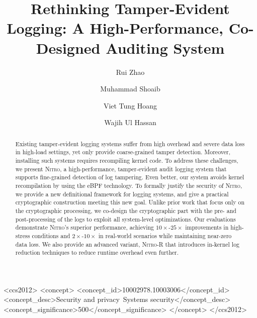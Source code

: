 \documentclass[sigconf]{sty/acmart}
\newcommand{\Sys}{\mbox{\textsc{Nitro}}\xspace}
\newcommand{\SysR}{\mbox{\textsc{Nitro-R}}\xspace}
\newcommand{\Syss}{{\textsc{Nitro}}'s }
\begin{document}
\title{Rethinking Tamper-Evident Logging: A High-Performance, Co-Designed Auditing System}

\author{Rui Zhao}

\author{Muhammad Shoaib}

\author{Viet Tung Hoang}

\author{Wajih Ul Hassan}
 \begin{abstract}
    Existing tamper-evident logging systems suffer from  high overhead and severe data loss in high-load settings, 
		yet only provide coarse-grained tamper detection. 
		Moreover, installing such systems requires
		recompiling kernel code. To address these challenges, we present \Sys, a high-performance, tamper-evident  audit logging system
		that supports fine-grained detection of log tampering. 
		Even better, our system avoids kernel recompilation by using the eBPF technology.
    To formally justify the security of \Sys, we provide a new definitional framework for logging systems, 
		and give a practical cryptographic construction meeting this new goal. 
		Unlike prior work that focus  only on the cryptographic processing, we co-design the cryptographic part with the pre- and post-processing of the logs 
		to exploit all system-level optimizations. 
		Our evaluations demonstrate \Syss superior performance, achieving $10\times$-$25\times$ improvements in high-stress conditions and $2\times$-$10\times$ in real-world scenarios while maintaining near-zero data loss.
		We also provide an advanced variant, \SysR that introduces in-kernel log reduction techniques to reduce runtime overhead even further. 
\end{abstract}
 \begin{CCSXML}
    <ccs2012>
       <concept>
           <concept_id>10002978.10003006</concept_id>
           <concept_desc>Security and privacy~Systems security</concept_desc>
           <concept_significance>500</concept_significance>
           </concept>
     </ccs2012>
\end{CCSXML}
    
 
 \maketitle
\end{document}
